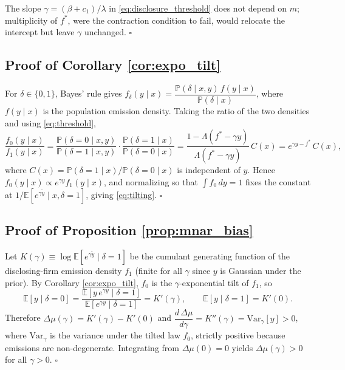 \documentclass[a4paper,12pt]{article}
\begin{document}
The slope $\gamma = (\beta+c_1)/\lambda$ in \eqref{eq:disclosure_threshold} does not depend on $m$; multiplicity of $f^*$, were the contraction condition to fail, would relocate the intercept but leave $\gamma$ unchanged. \hfill $\square$

\subsection{Proof of Corollary \ref{cor:expo_tilt}}
For $\delta \in \{0,1\}$, Bayes' rule gives $f_\delta(y \mid x) = \dfrac{\mathbb{P}(\delta \mid x, y)\, f(y \mid x)}{\mathbb{P}(\delta \mid x)}$, where $f(y \mid x)$ is the population emission density. Taking the ratio of the two densities and using \eqref{eq:threshold},
\begin{equation*}
    \frac{f_0(y \mid x)}{f_1(y \mid x)}
    = \frac{\mathbb{P}(\delta=0 \mid x, y)}{\mathbb{P}(\delta=1 \mid x, y)} \cdot \frac{\mathbb{P}(\delta=1 \mid x)}{\mathbb{P}(\delta=0 \mid x)}
    = \frac{1-\Lambda(f^*-\gamma y)}{\Lambda(f^*-\gamma y)}\, C(x)
    = e^{\gamma y - f^*}\, C(x),
\end{equation*}
where $C(x) = \mathbb{P}(\delta=1 \mid x)/\mathbb{P}(\delta=0 \mid x)$ is independent of $y$. Hence $f_0(y \mid x) \propto e^{\gamma y} f_1(y \mid x)$, and normalizing so that $\int f_0 \,dy = 1$ fixes the constant at $1/\mathbb{E}[e^{\gamma \tilde{y}} \mid x, \delta=1]$, giving \eqref{eq:tilting}. \hfill $\square$

\subsection{Proof of Proposition \ref{prop:mnar_bias}}
Let $K(\gamma) \equiv \log \mathbb{E}[e^{\gamma \tilde{y}} \mid \delta = 1]$ be the cumulant generating function of the disclosing-firm emission density $f_1$ (finite for all $\gamma$ since $y$ is Gaussian under the prior). By Corollary \ref{cor:expo_tilt}, $f_0$ is the $\gamma$-exponential tilt of $f_1$, so
\begin{equation*}
    \mathbb{E}[y \mid \delta = 0] = \frac{\mathbb{E}[y\, e^{\gamma y} \mid \delta = 1]}{\mathbb{E}[e^{\gamma y} \mid \delta = 1]} = K'(\gamma),
    \qquad \mathbb{E}[y \mid \delta = 1] = K'(0).
\end{equation*}
Therefore $\Delta\mu(\gamma) = K'(\gamma) - K'(0)$ and $\dfrac{d\,\Delta\mu}{d\gamma} = K''(\gamma) = \mathrm{Var}_\gamma[y] > 0$, where $\mathrm{Var}_\gamma$ is the variance under the tilted law $f_0$, strictly positive because emissions are non-degenerate. Integrating from $\Delta\mu(0) = 0$ yields $\Delta\mu(\gamma) > 0$ for all $\gamma > 0$. \hfill $\square$
\end{document}
